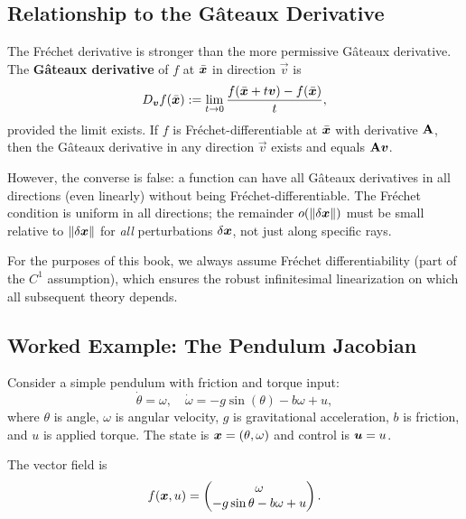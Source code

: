 \subsection{Relationship to the Gâteaux Derivative}

The Fréchet derivative is stronger than the more permissive Gâteaux derivative. The
\textbf{Gâteaux derivative} of $f$ at $\bar{\bm{x}}$ in direction $\vec{v}$ is
\begin{equation}
D_{\bm{v}} f(\bar{\bm{x}}) := \lim_{t \to 0} \frac{f(\bar{\bm{x}} + t\bm{v}) - f(\bar{\bm{x}})}{t},
\label{eq:ch1:gateaux}
\end{equation}
provided the limit exists. If $f$ is Fréchet-differentiable at $\bar{\bm{x}}$ with derivative
$\mathbf{A}$, then the Gâteaux derivative in any direction $\vec{v}$ exists and equals $\mathbf{A}\bm{v}$.

However, the converse is false: a function can have all Gâteaux derivatives in all directions
(even linearly) without being Fréchet-differentiable. The Fréchet condition is uniform in
all directions; the remainder $o(\left\lVert \delta\bm{x} \right\rVert)$ must be small relative to $\left\lVert \delta\bm{x} \right\rVert$ for
\emph{all} perturbations $\delta\bm{x}$, not just along specific rays.

For the purposes of this book, we always assume Fréchet differentiability (part of the $C^1$
assumption), which ensures the robust infinitesimal linearization on which all subsequent
theory depends.

\subsection{Worked Example: The Pendulum Jacobian}

Consider a simple pendulum with friction and torque input:
\begin{equation}
\dot\theta = \omega, \quad \dot\omega = -g\sin(\theta) - b\omega + u,
\label{eq:ch1:pendulum-dyn}
\end{equation}
where $\theta$ is angle, $\omega$ is angular velocity, $g$ is gravitational acceleration,
$b$ is friction, and $u$ is applied torque. The state is $\bm{x} = (\theta, \omega)$ and control
is $\bm{u} = u$.

The vector field is
\begin{equation}
f(\bm{x}, u) = \begin{pmatrix} \omega \\ -g\sin\theta - b\omega + u \end{pmatrix}.
\label{eq:ch1:pendulum-f}
\end{equation}

